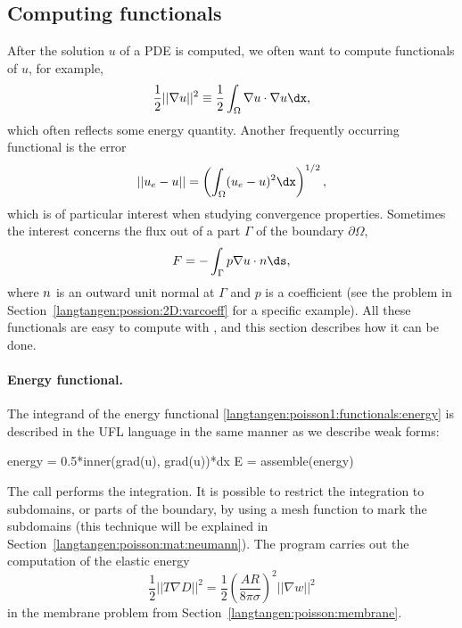 \subsection{Computing functionals}
\label{langtangen:poisson1:functionals}

After the solution $u$ of a PDE is computed, we often want to compute
functionals of $u$, for example,
\begin{equation}
  \frac{1}{2} ||\nabla u||^2 \equiv \frac{1}{2}\int_\Omega \nabla u\cdot \nabla u\dx,
\label{langtangen:poisson1:functionals:energy}
\end{equation}
which often reflects some energy quantity.  Another frequently
occurring functional is the error
\begin{equation}
  ||u_e-u|| = \left(\int_\Omega (u_e-u)^2\dx\right)^{1/2},
\label{langtangen:poisson1:functionals:error}
\end{equation}
which is of particular interest when studying convergence properties.
Sometimes the interest concerns the flux out of a part $\Gamma$ of the
boundary $\partial\Omega$,
\begin{equation}
  F = -\int_\Gamma p\nabla u\cdot\langtangennormalvec\ds,
\label{langtangen:poisson1:functionals:flux}
\end{equation}
where ${n}$ is an outward unit normal
at $\Gamma$ and $p$ is a coefficient (see the problem in
Section~\ref{langtangen:possion:2D:varcoeff} for a specific example).
All these functionals are easy to compute with \fenics, and this section
describes how it can be done.

\paragraph{Energy functional.}
The integrand of the energy functional
\eqref{langtangen:poisson1:functionals:energy} is described in the UFL
language in the same manner as we describe weak forms:
\begin{python}
energy = 0.5*inner(grad(u), grad(u))*dx
E = assemble(energy)
\end{python}
The  call performs the integration.  It is possible to
restrict the integration to subdomains, or parts of the boundary,
by using a mesh function to mark the subdomains (this technique will be
explained
in Section~\ref{langtangen:poisson:mat:neumann}).  The program
 carries out the computation of the elastic energy
\begin{equation}
   \frac{1}{2}||T\nabla D||^2 = \frac{1}{2}\left(\frac{AR}{8\pi\sigma}\right)^2
    ||\nabla w||^2
\end{equation}
in the membrane problem from Section~\ref{langtangen:poisson:membrane}.

